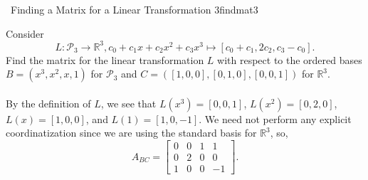         \pagebreak
        \begin{example}{\Difficulty\,\Difficulty\,\,Finding a Matrix for a Linear Transformation 3}{findmat3}
            
            Consider
            \begin{equation*}
                L:\mathcal{P}_3\to\mathbb{R}^3, c_0+c_1x+c_2x^2+c_3x^3\mapsto[c_0+c_1,2c_2,c_3-c_0].
            \end{equation*}
            Find the matrix for the linear transformation \(L\) with respect to the ordered bases \(B=(x^3,x^2,x,1)\) for \(\mathcal{P}_{3}\) and \(C=([1,0,0],[0,1,0],[0,0,1])\) for \(\mathbb{R}^3\).
            \\
            \\
            By the definition of \(L\), we see that \(L(x^3)=[0,0,1]\), \(L(x^2)=[0,2,0]\), \(L(x)=[1,0,0]\), and \(L(1)=[1,0,-1]\). We need not perform any explicit coordinatization since we are using the standard basis for \(\mathbb{R}^3\), so,
            \begin{equation*}
                A_{BC}=\begin{bmatrix}
                    0 & 0 & 1 & 1 \\
                    0 & 2 & 0 & 0 \\
                    1 & 0 & 0 & -1
                \end{bmatrix}.
            \end{equation*}
            
        \end{example}
